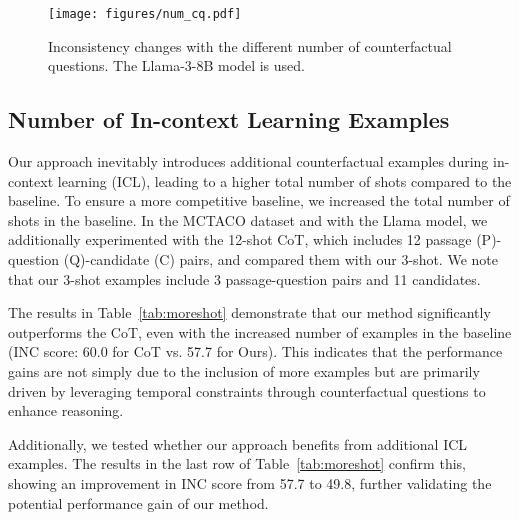 \begin{figure}[h]
    \centering
    \texttt{[image: figures/num\_cq.pdf]}
    \vspace{-8mm}
    \caption{Inconsistency changes with the different number of counterfactual questions. The Llama-3-8B model is used.}
    \label{fig:num_cq}
    \vspace{-3mm}
\end{figure}



\subsection{Number of In-context Learning Examples}

Our approach inevitably introduces additional counterfactual examples during in-context learning (ICL), leading to a higher total number of shots compared to the baseline. To ensure a more competitive baseline, we increased the total number of shots in the baseline. In the MCTACO dataset and with the Llama model, we additionally experimented with the 12-shot CoT, which includes 12 passage (P)-question (Q)-candidate (C) pairs, and compared them with our 3-shot. We note that our 3-shot examples include 3 passage-question pairs and 11 candidates.

The results in Table~\ref{tab:moreshot} demonstrate that our method significantly outperforms the CoT, even with the increased number of examples in the baseline (INC score: 60.0 for CoT vs. 57.7 for Ours). This indicates that the performance gains are not simply due to the inclusion of more examples but are primarily driven by leveraging temporal constraints through counterfactual questions to enhance reasoning.

Additionally, we tested whether our approach benefits from additional ICL examples. The results in the last row of Table~\ref{tab:moreshot} confirm this, showing an improvement in INC score from 57.7 to 49.8, further validating the potential performance gain of our method.

